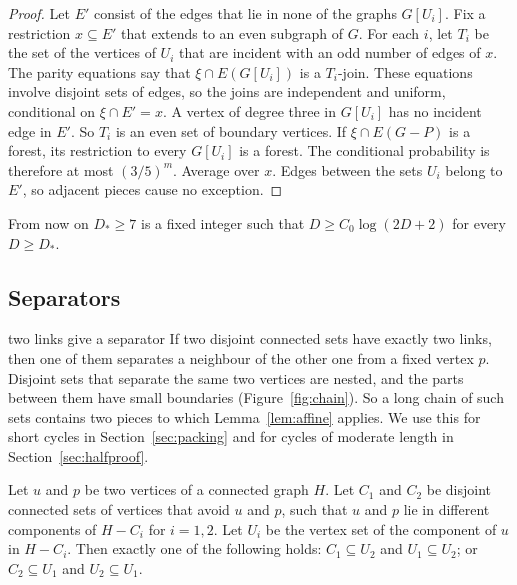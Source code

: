 \begin{proof}
Let $E'$ consist of the edges that lie in none of the graphs $G[U_i]$. Fix a restriction
$x\subseteq E'$ that extends to an even subgraph of $G$. For each $i$, let $T_i$ be the set of the
vertices of $U_i$ that are incident with an odd number of edges of $x$. The parity equations say
that $\xi\cap E(G[U_i])$ is a $T_i$-join. These equations involve disjoint sets of edges, so the
joins are independent and uniform, conditional on $\xi\cap E'=x$. A vertex of degree three in
$G[U_i]$ has no incident edge in $E'$. So $T_i$ is an even set of boundary vertices. If
$\xi\cap E(G-P)$ is a forest, its restriction to every $G[U_i]$ is a forest. The conditional
probability is therefore at most $(3/5)^m$. Average over $x$. Edges between the sets $U_i$ belong
to $E'$, so adjacent pieces cause no exception.
\end{proof}

From now on $D_{*}\ge7$ is a fixed integer such that $D\ge C_0\log(2D+2)$ for every $D\ge D_{*}$.

\subsection{Separators}\label{sec:separators}

\begin{idea}{two links give a separator}
If two disjoint connected sets have exactly two links, then one of them separates a neighbour of
the other one from a fixed vertex $p$. Disjoint sets that separate the same two vertices are
nested, and the parts between them have small boundaries (Figure~\ref{fig:chain}). So a long
chain of such sets contains two pieces to which Lemma~\ref{lem:affine} applies. We use this for
short cycles in Section~\ref{sec:packing} and for cycles of moderate length in
Section~\ref{sec:halfproof}.
\end{idea}

\begin{lemma}\label{lem:nested}
Let $u$ and $p$ be two vertices of a connected graph $H$. Let $C_1$ and $C_2$ be disjoint connected
sets of vertices that avoid $u$ and $p$, such that $u$ and $p$ lie in different components of
$H-C_i$ for $i=1,2$. Let $U_i$ be the vertex set of the component of $u$ in $H-C_i$. Then exactly
one of the following holds: $C_1\subseteq U_2$ and $U_1\subseteq U_2$; or $C_2\subseteq U_1$ and
$U_2\subseteq U_1$.
\end{lemma}

